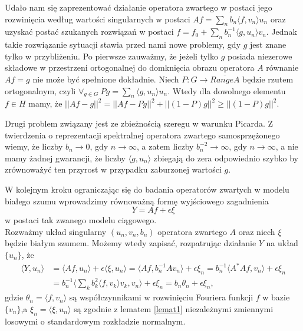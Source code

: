 \documentclass[man,mfiu]{mgrwms}
\begin{document}
Udało nam się zaprezentować działanie operatora zwartego w postaci jego rozwinięcia według wartości singularnych w postaci $Af=\sum_nb_n\langle f, v_n\rangle u_n$ oraz uzyskać postać szukanych rozwiązań w postaci $f=f_0+\sum_nb_n^{-1}\langle g, u_n\rangle v_n$. Jednak takie rozwiązanie sytuacji stawia przed nami nowe problemy, gdy $g$ jest znane tylko w przybliżeniu. Po pierwsze zauważmy, że jeżeli tylko $g$ posiada niezerowe składowe w przestrzeni ortogonalnej do domknięcia obrazu operatora $A$ równanie $Af=g$ nie może być spełnione dokładnie. Niech $P\colon G\to \overline{RangeA}$ będzie rzutem ortogonalnym, czyli $\forall_{g\in G}\ Pg=\sum_n\langle g,u_n\rangle u_n$. Wtedy dla dowolnego elementu $f\in H$ mamy, że $||Af-g||^2=||Af-Pg||^2+||(1-P)g||^2\geq ||(1-P)g||^2$.

Drugi problem związany jest ze zbieżnością szeregu w warunku Picarda. Z twierdzenia o reprezentacji spektralnej operatora zwartego samosprzężonego wiemy, że liczby $b_n\to 0$, gdy $n\to \infty$, a zatem liczby $b_n^{-2}\to \infty$, gdy $n \to \infty$, a nie mamy żadnej gwarancji, że liczby $\langle g,u_n\rangle$ zbiegają do zera odpowiednio szybko by zrównoważyć ten przyrost w przypadku zaburzonej wartości $g$.


W kolejnym kroku ograniczając się do badania operatorów zwartych w modelu białego szumu wprowadzimy równoważną formę wyjściowego zagadnienia 
\begin{displaymath}
Y=Af+\epsilon\xi
\end{displaymath}
w postaci tak zwanego modelu ciągowego.\\

Rozważmy układ singularny $(u_n,v_n,b_n)$ operatora zwartego $A$ oraz niech $\xi$ będzie białym szumem. Możemy wtedy zapisać, rozpatrując działanie $Y$ na układ $\{u_n\}$, że
\begin{displaymath}
\begin{split}
\langle Y,u_n\rangle &=\langle Af,u_n\rangle +\epsilon\langle \xi, u_n\rangle=\langle Af,b_n^{-1}Av_n\rangle+\epsilon \xi_n=b_n^{-1}\langle A^*Af, v_n\rangle+\epsilon \xi_n\\
&=b_n^{-1}\langle \sum_kb_k^2\langle f, v_k\rangle v_k, v_n\rangle +\epsilon\xi_n=b_n\theta_n+\epsilon\xi_n,
\end{split}
\end{displaymath}
gdzie $\theta_n=\langle f,v_n\rangle$ są współczynnikami w rozwinięciu Fouriera funkcji $f$ w bazie $\{v_n\}$,a $\xi_n=\langle \xi, u_n\rangle$ są zgodnie z lematem \ref{lemat1} niezależnymi zmiennymi losowymi o standardowym rozkładzie normalnym.
\end{document}

